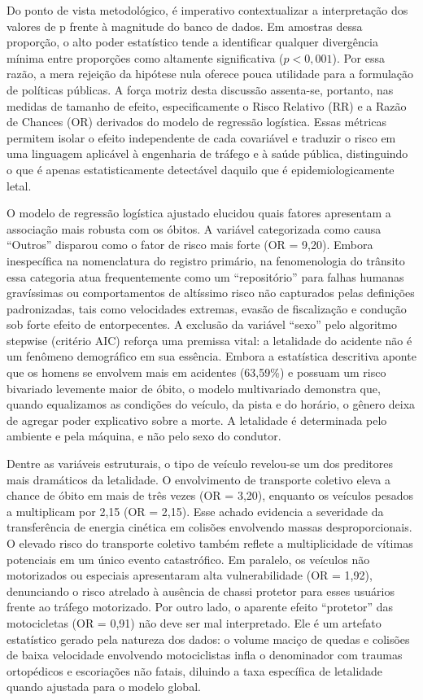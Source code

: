 \documentclass[
  brazilian,
  12pt,
]{article}
\begin{document}
Do ponto de vista metodológico, é imperativo contextualizar a
interpretação dos valores de p frente à magnitude do banco de dados. Em
amostras dessa proporção, o alto poder estatístico tende a identificar
qualquer divergência mínima entre proporções como altamente
significativa (\(p < 0,001\)). Por essa razão, a mera rejeição da
hipótese nula oferece pouca utilidade para a formulação de políticas
públicas. A força motriz desta discussão assenta-se, portanto, nas
medidas de tamanho de efeito, especificamente o Risco Relativo (RR) e a
Razão de Chances (OR) derivados do modelo de regressão logística. Essas
métricas permitem isolar o efeito independente de cada covariável e
traduzir o risco em uma linguagem aplicável à engenharia de tráfego e à
saúde pública, distinguindo o que é apenas estatisticamente detectável
daquilo que é epidemiologicamente letal.

O modelo de regressão logística ajustado elucidou quais fatores
apresentam a associação mais robusta com os óbitos. A variável
categorizada como causa ``Outros'' disparou como o fator de risco mais
forte (OR = 9,20). Embora inespecífica na nomenclatura do registro
primário, na fenomenologia do trânsito essa categoria atua
frequentemente como um ``repositório'' para falhas humanas gravíssimas
ou comportamentos de altíssimo risco não capturados pelas definições
padronizadas, tais como velocidades extremas, evasão de fiscalização e
condução sob forte efeito de entorpecentes. A exclusão da variável
``sexo'' pelo algoritmo stepwise (critério AIC) reforça uma premissa
vital: a letalidade do acidente não é um fenômeno demográfico em sua
essência. Embora a estatística descritiva aponte que os homens se
envolvem mais em acidentes (63,59\%) e possuam um risco bivariado
levemente maior de óbito, o modelo multivariado demonstra que, quando
equalizamos as condições do veículo, da pista e do horário, o gênero
deixa de agregar poder explicativo sobre a morte. A letalidade é
determinada pelo ambiente e pela máquina, e não pelo sexo do condutor.

Dentre as variáveis estruturais, o tipo de veículo revelou-se um dos
preditores mais dramáticos da letalidade. O envolvimento de transporte
coletivo eleva a chance de óbito em mais de três vezes (OR = 3,20),
enquanto os veículos pesados a multiplicam por 2,15 (OR = 2,15). Esse
achado evidencia a severidade da transferência de energia cinética em
colisões envolvendo massas desproporcionais. O elevado risco do
transporte coletivo também reflete a multiplicidade de vítimas
potenciais em um único evento catastrófico. Em paralelo, os veículos não
motorizados ou especiais apresentaram alta vulnerabilidade (OR = 1,92),
denunciando o risco atrelado à ausência de chassi protetor para esses
usuários frente ao tráfego motorizado. Por outro lado, o aparente efeito
``protetor'' das motocicletas (OR = 0,91) não deve ser mal interpretado.
Ele é um artefato estatístico gerado pela natureza dos dados: o volume
maciço de quedas e colisões de baixa velocidade envolvendo motociclistas
infla o denominador com traumas ortopédicos e escoriações não fatais,
diluindo a taxa específica de letalidade quando ajustada para o modelo
global.
\end{document}
